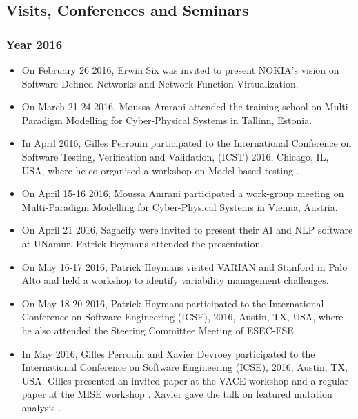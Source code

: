 \subsection{Visits, Conferences and Seminars}
\label{sec:Visits}

\subsubsection{Year 2016}
\label{sec:2016}

\begin{itemize}

\item On February 26 2016, Erwin Six was invited to present NOKIA's vision on Software Defined Networks and Network Function Virtualization. 

\item On March 21-24 2016, Moussa Amrani attended the training school on Multi-Paradigm Modelling for Cyber-Physical Systems in Tallinn, Estonia.

\item In April 2016, Gilles Perrouin participated to the International Conference on Software Testing, Verification and Validation, (ICST) 2016, Chicago, IL, USA, where he co-organised a workshop on Model-based testing \cite{Papadakis16}.

\item On April 15-16 2016, Moussa Amrani participated a work-group meeting on Multi-Paradigm Modelling for Cyber-Physical Systems in Vienna, Austria.

\item On April 21 2016, Sagacify were invited to present their AI and NLP software at UNamur. Patrick Heymans attended the presentation. 

\item On May 16-17 2016, Patrick Heymans visited VARIAN and Stanford in Palo Alto and held a workshop to identify variability management challenges.

\item On May 18-20 2016, Patrick Heymans participated to the International Conference on Software Engineering (ICSE), 2016, Austin, TX, USA, where he also attended the Steering Committee Meeting of ESEC-FSE. 

\item In May 2016, Gilles Perrouin and Xavier Devroey participated to the International Conference on Software Engineering (ICSE), 2016, Austin, TX, USA. Gilles presented an invited paper at the VACE workshop \cite{Perrouin16a} and a regular paper at the MISE workshop \cite{Perrouin16}. Xavier gave the talk on featured mutation analysis \cite{Devorey16a}.


\end{itemize}

